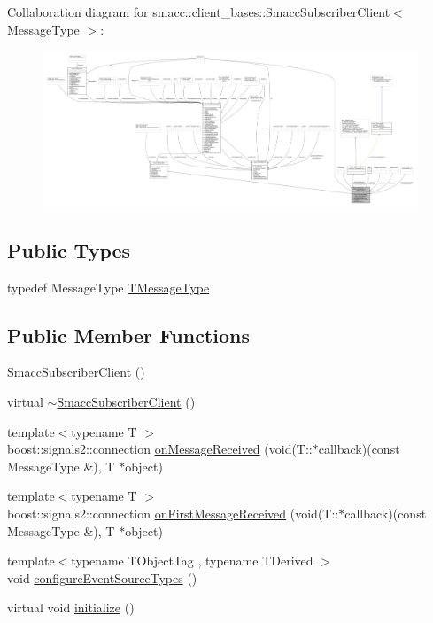 Collaboration diagram for smacc\+:\+:client\+\_\+bases\+:\+:Smacc\+Subscriber\+Client$<$ Message\+Type $>$\+:
\nopagebreak
\begin{figure}[H]
\begin{center}
\leavevmode
\includegraphics[width=350pt]{classsmacc_1_1client__bases_1_1SmaccSubscriberClient__coll__graph}
\end{center}
\end{figure}
\subsection*{Public Types}
\begin{DoxyCompactItemize}
\item 
typedef Message\+Type \hyperlink{classsmacc_1_1client__bases_1_1SmaccSubscriberClient_a61d798bda71bf335d72e61928ca561b0}{T\+Message\+Type}
\end{DoxyCompactItemize}
\subsection*{Public Member Functions}
\begin{DoxyCompactItemize}
\item 
\hyperlink{classsmacc_1_1client__bases_1_1SmaccSubscriberClient_a9c3dd9981beb495a0646667acae06d73}{Smacc\+Subscriber\+Client} ()
\item 
virtual \hyperlink{classsmacc_1_1client__bases_1_1SmaccSubscriberClient_a91b9206c97b4acc76d4202639d24a53b}{$\sim$\+Smacc\+Subscriber\+Client} ()
\item 
{\footnotesize template$<$typename T $>$ }\\boost\+::signals2\+::connection \hyperlink{classsmacc_1_1client__bases_1_1SmaccSubscriberClient_a4f02251e3a161fb6d802b154b1081f18}{on\+Message\+Received} (void(T\+::$\ast$callback)(const Message\+Type \&), T $\ast$object)
\item 
{\footnotesize template$<$typename T $>$ }\\boost\+::signals2\+::connection \hyperlink{classsmacc_1_1client__bases_1_1SmaccSubscriberClient_a3f6dc8ef86f21f401204182778cc584d}{on\+First\+Message\+Received} (void(T\+::$\ast$callback)(const Message\+Type \&), T $\ast$object)
\item 
{\footnotesize template$<$typename T\+Object\+Tag , typename T\+Derived $>$ }\\void \hyperlink{classsmacc_1_1client__bases_1_1SmaccSubscriberClient_adf0e61d4a0b34ecc76fb9f4c3d04ef97}{configure\+Event\+Source\+Types} ()
\item 
virtual void \hyperlink{classsmacc_1_1client__bases_1_1SmaccSubscriberClient_af188f0f5e89de26a07e1f964cdd23a70}{initialize} ()
\end{DoxyCompactItemize}
